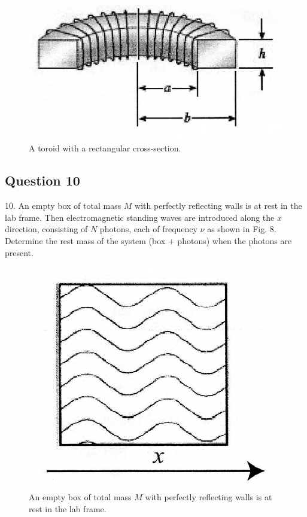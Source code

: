 \documentclass{article}
\begin{document}
\begin{figure}
	\centering
	\includegraphics[width=0.8\linewidth]{spho_book_TYS_images/2010q9_2.png}
	\caption{A toroid with a rectangular cross-section.} \label{2010q9_2}
\end{figure}

\subsection{Question 10}
10. An empty box of total mass $M$ with perfectly reflecting walls is at rest in the lab frame. Then electromagnetic standing waves are introduced along the $x$ direction, consisting of $N$ photons, each of frequency $\nu$ as shown in Fig. 8. Determine the rest mass of the system (box + photons) when the photons are present.
\begin{figure}
	\centering
	\includegraphics[width=0.5\linewidth]{spho_book_TYS_images/2010q10.png}
	\caption{An empty box of total mass $M$ with perfectly reflecting walls is at rest in the lab frame.}
\end{figure}
\end{document}
